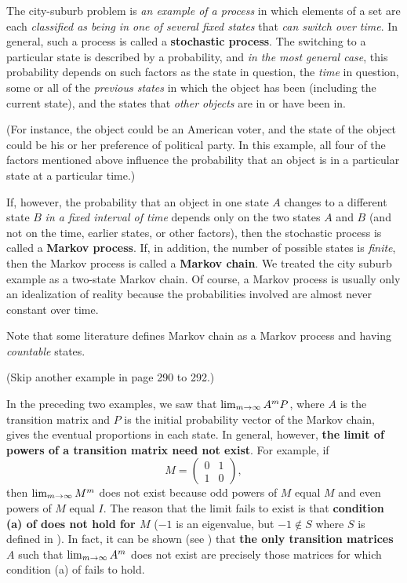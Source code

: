 \begin{remark} \label{remark 5.3.5}
The city-suburb problem is \emph{an example of a process} in which elements of a set are each \emph{classified as being in one of several fixed states} that \emph{can switch over time}.
In general, such a process is called a \textbf{stochastic process}.
The switching to a particular state is described by a probability, and \emph{in the most general case}, this probability depends on such factors as the state in question, the \emph{time} in question, some or all of the \emph{previous states} in which the object has been (including the current state), and the states that \emph{other objects} are in or have been in.

(For instance, the object could be an American voter, and the state of the object could be his or her preference of political party.
In this example, all four of the factors mentioned above influence the probability that an object is in a particular state at a particular time.)

If, however, the probability that an object in one state \(A\) changes to a different state \(B\) \emph{in a fixed interval of time} depends only on the two states \(A\) and \(B\) (and not on the time, earlier states, or other factors), then the stochastic process is called a \textbf{Markov process}.
If, in addition, the number of possible states is \emph{finite}, then the Markov process is called a \textbf{Markov chain}.
We treated the city suburb example as a two-state Markov chain.
Of course, a Markov process is usually only an idealization of reality because the probabilities involved are almost never constant over time.

Note that some literature defines Markov chain as a Markov process and having \emph{countable} states.
\end{remark}

(Skip another example in page 290 to 292.)

In the preceding two examples, we saw that \(\lim_{m \to \infty} A^m P\), where \(A\) is the transition matrix and \(P\) is the initial probability vector of the Markov chain, gives the eventual proportions in each state.
In general, however, \textbf{the limit of powers of a transition matrix need not exist}.
For example, if
\[
    M = \begin{pmatrix} 0 & 1 \\ 1 & 0 \end{pmatrix},
\]
then \(\lim_{m \to \infty} M^m\) does not exist because odd powers of \(M\) equal \(M\) and even powers of \(M\) equal \(I\).
The reason that the limit fails to exist is that \textbf{condition (a) of  does not hold for \(M\)} (\(-1\) is an eigenvalue, but \(-1 \notin S\) where \(S\) is defined in ).
In fact, it can be shown (see ) that \textbf{the only transition matrices} \(A\) such that \(\lim_{m \to \infty} A^m\) does not exist are precisely those matrices for which condition (a) of  fails to hold.

